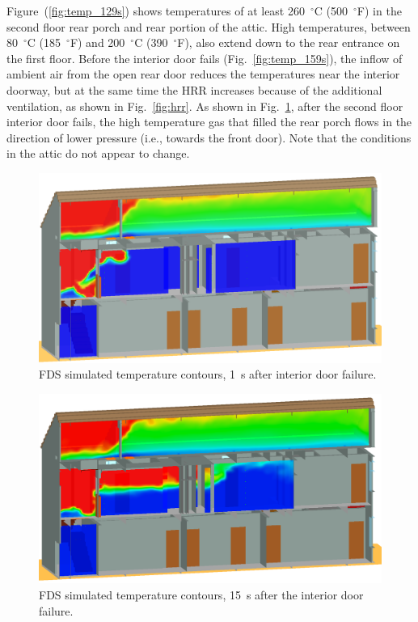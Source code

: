 \documentclass[12pt,oneside]{book}
\begin{document}
Figure~(\ref{fig:temp_129s}) shows temperatures of at least 260~$^{\circ}$C (500~$^{\circ}$F) in the second floor rear porch and rear portion of the attic. High temperatures, between 80~$^{\circ}$C (185~$^{\circ}$F) and 200~$^{\circ}$C (390~$^{\circ}$F), also extend down to the rear entrance on the first floor. Before the interior door fails (Fig.~\ref{fig:temp_159s}), the inflow of ambient air from the open rear door reduces the temperatures near the interior doorway, but at the same time the HRR increases because of the additional ventilation, as shown in Fig.~\ref{fig:hrr}. As shown in Fig.~\ref{fig:temp_161s}, after the second floor interior door fails, the high temperature gas that filled the rear porch flows in the direction of lower pressure (i.e., towards the front door). Note that the conditions in the attic do not appear to change.
\begin{figure}[!ht]
\includegraphics[width=.675\textwidth]{../Figures/west_50th_baseline_161}
 

\caption{FDS simulated temperature contours, 1~s after interior door failure.}
\label{fig:temp_161s}
\end{figure}

\begin{figure}[!ht]
\includegraphics[width=.675\textwidth]{../Figures/west_50th_baseline_175}
 

\caption{FDS simulated temperature contours, 15~s after the interior door failure.}
\label{fig:temp_175s}
\end{figure}
\end{document}
